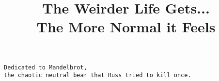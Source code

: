 \documentclass{report}
\title{\textbf{The Weirder Life Gets... \\ \hspace{5em} The More Normal it Feels}}
\begin{document}
\maketitle
\newpage \vspace*{6cm}
\thispagestyle{empty}
\begin{center}
\texttt{Dedicated to Mandelbrot, \\ the chaotic neutral bear
that Russ tried to kill once.}
\end{center}





\end{document}
